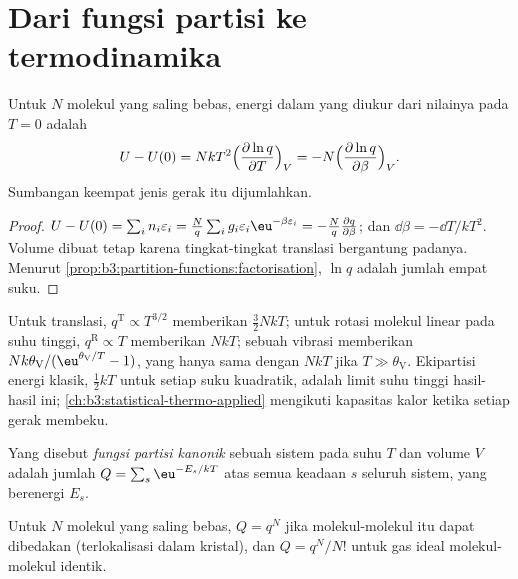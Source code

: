 \section{Dari fungsi partisi ke termodinamika}

\begin{theorem}\label{thm:b3:partition-functions:internal-energy}
Untuk $N$ molekul yang saling bebas, energi dalam yang diukur dari nilainya
pada $T = 0$ adalah
\[
  U - U(0) = NkT^2\Bigl(\frac{\partial\ln q}{\partial T}\Bigr)_V
          = -N\Bigl(\frac{\partial\ln q}{\partial\beta}\Bigr)_V .
\]
Sumbangan keempat jenis gerak itu dijumlahkan.
\end{theorem}

\begin{proof}
$U - U(0) = \sum_in_i\varepsilon_i = \frac Nq\sum_ig_i\varepsilon_i\eu^{-\beta\varepsilon_i} = -\frac Nq\frac{\partial q}{\partial\beta}$;
dan $\dd\beta = -\dd T/kT^2$. Volume dibuat tetap karena tingkat-tingkat
translasi bergantung padanya. Menurut
\cref{prop:b3:partition-functions:factorisation}, $\ln q$ adalah jumlah empat
suku.
\end{proof}

Untuk translasi, $q^{\mathrm T} \propto T^{3/2}$ memberikan $\frac32NkT$; untuk rotasi
molekul linear pada suhu tinggi, $q^{\mathrm R} \propto T$ memberikan $NkT$; sebuah
vibrasi memberikan $Nk\theta_{\mathrm V}/(\eu^{\theta_{\mathrm V}/T} - 1)$, yang hanya sama
dengan $NkT$ jika $T \gg \theta_{\mathrm V}$. Ekipartisi energi klasik, $\frac12kT$
untuk setiap suku kuadratik, adalah limit suhu tinggi hasil-hasil ini;
\cref{ch:b3:statistical-thermo-applied} mengikuti kapasitas kalor ketika
setiap gerak membeku.

\begin{definition}\label{def:b3:partition-functions:canonical}
Yang disebut \emph{fungsi partisi kanonik}
sebuah sistem pada suhu $T$ dan volume $V$ adalah jumlah $Q = \sum_s\eu^{-E_s/kT}$
atas semua keadaan $s$ seluruh sistem, yang berenergi $E_s$.
\end{definition}

\begin{proposition}\label{prop:b3:partition-functions:canonical}
Untuk $N$ molekul yang saling bebas, $Q = q^N$ jika molekul-molekul itu dapat
dibedakan (terlokalisasi dalam kristal), dan $Q = q^N/N!$ untuk gas ideal
molekul-molekul identik.
\end{proposition}

